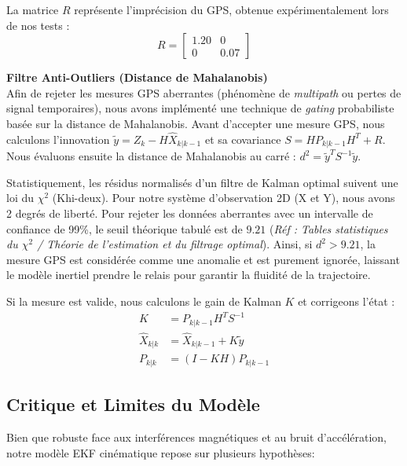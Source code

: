 La matrice $R$ représente l'imprécision du GPS, obtenue expérimentalement lors de nos tests :
\begin{equation}
 R = \begin{bmatrix} 1.20 & 0 \\ 0 & 0.07 \end{bmatrix} 
\end{equation}

\textbf{Filtre Anti-Outliers (Distance de Mahalanobis)} \\
Afin de rejeter les mesures GPS aberrantes (phénomène de \textit{multipath} ou pertes de signal temporaires), nous avons implémenté une technique de \textit{gating} probabiliste basée sur la distance de Mahalanobis. Avant d'accepter une mesure GPS, nous calculons l'innovation $\tilde{y} = Z_k - H \hat{X}_{k|k-1}$ et sa covariance $S = H P_{k|k-1} H^T + R$.
Nous évaluons ensuite la distance de Mahalanobis au carré : $d^2 = \tilde{y}^T S^{-1} \tilde{y}$. 

Statistiquement, les résidus normalisés d'un filtre de Kalman optimal suivent une loi du $\chi^2$ (Khi-deux). Pour notre système d'observation 2D (X et Y), nous avons 2 degrés de liberté.
Pour rejeter les données aberrantes avec un intervalle de confiance de 99\%, le seuil théorique tabulé est de $9.21$ (\textit{Réf : Tables statistiques du $\chi^2$ / Théorie de l'estimation et du filtrage optimal}). 
Ainsi, si $d^2 > 9.21$, la mesure GPS est considérée comme une anomalie et est purement ignorée, laissant le modèle inertiel prendre le relais pour garantir la fluidité de la trajectoire.

Si la mesure est valide, nous calculons le gain de Kalman $K$ et corrigeons l'état :
\begin{align}
   K &= P_{k|k-1} H^T S^{-1} \\
   \hat{X}_{k|k} &= \hat{X}_{k|k-1} + K \tilde{y} \\
   P_{k|k} &= (I - K H) P_{k|k-1}
\end{align}

\subsection{Critique et Limites du Modèle}

Bien que robuste face aux interférences magnétiques et au bruit d'accélération, notre modèle EKF cinématique repose sur plusieurs hypothèses:

